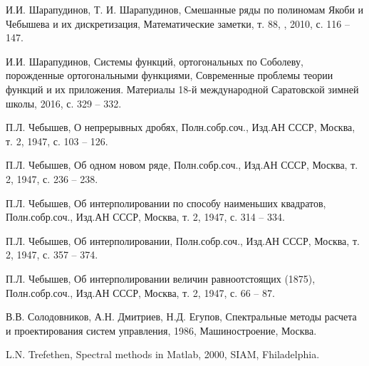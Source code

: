 \begin{thebibliography}{999}


И.И. Шарапудинов, Т. И. Шарапудинов,
Смешанные ряды по полиномам Якоби и Чебышева и их дискретизация,
Математические заметки, т. 88, , 2010, с. 116 -- 147.






И.И. Шарапудинов,
Системы функций, ортогональных по Соболеву, порожденные ортогональными функциями,
Современные проблемы теории функций и их приложения.  Материалы 18-й международной Саратовской зимней школы,
2016, с. 329 -- 332.





П.Л. Чебышев,
О непрерывных дробях, Полн.собр.соч., Изд.АН СССР, Москва, т. 2, 1947, с. 103 -- 126.





П.Л. Чебышев,
Об одном новом ряде, Полн.собр.соч., Изд.АН СССР, Москва, т. 2, 1947, с. 236 -- 238.





П.Л. Чебышев,
Об интерполировании по способу наименьших квадратов,
Полн.собр.соч., Изд.АН СССР, Москва, т. 2, 1947, с. 314 -- 334.





П.Л. Чебышев,
Об интерполировании, Полн.собр.соч., Изд.АН СССР, Москва, т. 2, 1947, с. 357 -- 374.





П.Л. Чебышев,
Об интерполировании величин  равноотстоящих (1875),
Полн.собр.соч., Изд.АН СССР, Москва, т. 2, 1947, с. 66 -- 87.





В.В. Солодовников, А.Н. Дмитриев, Н.Д. Егупов,
Спектральные методы расчета и проектирования систем управления, 1986, Машиностроение, Москва.






L.N. Trefethen,
Spectral methods in Matlab, 2000, SIAM, Fhiladelphia.




\end{thebibliography}

